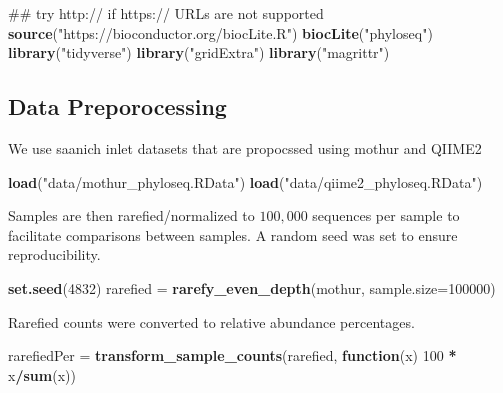 \documentclass[11 pt,]{article}
\newenvironment{Shaded}{\begin{snugshade}}{\end{snugshade}}
\newcommand{\KeywordTok}[1]{\textcolor[rgb]{0.13,0.29,0.53}{\textbf{#1}}}
\newcommand{\DataTypeTok}[1]{\textcolor[rgb]{0.13,0.29,0.53}{#1}}
\newcommand{\DecValTok}[1]{\textcolor[rgb]{0.00,0.00,0.81}{#1}}
\newcommand{\StringTok}[1]{\textcolor[rgb]{0.31,0.60,0.02}{#1}}
\newcommand{\ControlFlowTok}[1]{\textcolor[rgb]{0.13,0.29,0.53}{\textbf{#1}}}
\newcommand{\OperatorTok}[1]{\textcolor[rgb]{0.81,0.36,0.00}{\textbf{#1}}}
\newcommand{\NormalTok}[1]{#1}
\begin{document}
\begin{Shaded}
\begin{Highlighting}[]
\NormalTok{## try http:// if https:// URLs are not supported}
\KeywordTok{source}\NormalTok{(}\StringTok{"https://bioconductor.org/biocLite.R"}\NormalTok{)  }
\KeywordTok{biocLite}\NormalTok{(}\StringTok{"phyloseq"}\NormalTok{)}
\KeywordTok{library}\NormalTok{(}\StringTok{"tidyverse"}\NormalTok{)}
\KeywordTok{library}\NormalTok{(}\StringTok{"gridExtra"}\NormalTok{)}
\KeywordTok{library}\NormalTok{(}\StringTok{"magrittr"}\NormalTok{)}
\end{Highlighting}
\end{Shaded}

\subsection{Data Preporocessing}\label{data-preporocessing}

We use saanich inlet datasets that are propocssed using mothur and
QIIME2

\begin{Shaded}
\begin{Highlighting}[]
\KeywordTok{load}\NormalTok{(}\StringTok{"data/mothur_phyloseq.RData"}\NormalTok{)}
\KeywordTok{load}\NormalTok{(}\StringTok{"data/qiime2_phyloseq.RData"}\NormalTok{)}
\end{Highlighting}
\end{Shaded}

Samples are then rarefied/normalized to \(100,000\) sequences per sample
to facilitate comparisons between samples. A random seed was set to
ensure reproducibility.

\begin{Shaded}
\begin{Highlighting}[]
\KeywordTok{set.seed}\NormalTok{(}\DecValTok{4832}\NormalTok{)}
\NormalTok{rarefied =}\StringTok{ }\KeywordTok{rarefy_even_depth}\NormalTok{(mothur, }\DataTypeTok{sample.size=}\DecValTok{100000}\NormalTok{)}
\end{Highlighting}
\end{Shaded}

Rarefied counts were converted to relative abundance percentages.

\begin{Shaded}
\begin{Highlighting}[]
\NormalTok{rarefiedPer =}\StringTok{ }\KeywordTok{transform_sample_counts}\NormalTok{(rarefied, }\ControlFlowTok{function}\NormalTok{(x) }\DecValTok{100} \OperatorTok{*}\StringTok{ }\NormalTok{x}\OperatorTok{/}\KeywordTok{sum}\NormalTok{(x))}
\end{Highlighting}
\end{Shaded}
\end{document}
